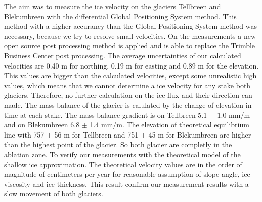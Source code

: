 The aim was to measure the ice velocity on the glaciers Tellbreen and Blekumbreen  with the differential Global Positioning System method. 
This method with a higher accurancy than the Global Positioning System method was necessary, because we try to resolve small velocities.
On the measurements a new open source post processing method is applied and is able to replace the Trimble Business Center post processing.
The average uncertainties of our calculated velocities are 0.40 m for northing, 0.19 m for easting and 0.89 m for the elevation.
This values are bigger than the calculated velocities, except some unrealistic high values, which means that we cannot determine a ice velocity for any stake both glaciers.
Therefore, no further calculation on the ice flux and their direction can made.
The mass balance of the glacier is calulated by the change of elevation in time at each stake. 
The mass balance gradient is on Tellbreen 5.1 $\pm$ 1.0 mm/m and on Blekumbreen 6.8 $\pm$ 1.4 mm/m. The elevation of theoretical equilibrium line with 757 $\pm$ 56 m for Tellbreen and 751 $\pm$ 45 m for Blekumbreen are higher than the highest point of the glacier. 
So both glacier are completly in the ablation zone.
To verify our measurements with the theoretical model of the shallow ice approximation.
The theoretical velocity values are in the order of magnitude of centimeters per year for reasonable assumption of slope angle, ice viscosity and ice thickness.
This result confirm our measurement results with a slow movement of both glaciers.